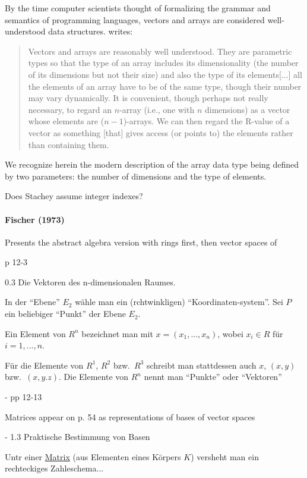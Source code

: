 By the time computer scientists thought of formalizing the grammar and semantics of programming languages,
vectors and arrays are considered well-understood data structures. \cite[\S 3.7.7, pp. 43--44]{Strachey1967} writes:
\begin{quote}
Vectors and arrays are reasonably well understood. They are parametric types so that the type of an array includes its dimensionality (the number of
its dimensions but not their size) and also the type of its elements[...]
all the elements of an array have to be of the same type, though their number may vary dynamically.
It is convenient, though perhaps not really necessary, to regard an $n$-array
(i.e., one with $n$ dimensions) as a vector whose elements are ($n-1$)-arrays.
We can then regard the R-value of a vector as something [that] gives access (or points to) the elements rather than containing them.
\end{quote}
We recognize herein the modern description of the array data type being defined by
two parameters: the number of dimensions and the type of elements.

Does Stachey assume integer indexes?



\paragraph{Fischer (1973)~\cite{Fischer1973}}

Presents the abstract algebra version with rings first, then vector spaces of

p 12-3

0.3 Die Vektoren des n-dimensionalen Raumes.

In der ``Ebene'' $E_2$ wähle man ein (rchtwinkligen) ``Koordinaten-system''. Sei $P$ ein beliebiger ``Punkt'' der Ebene $E_2$.

Ein Element von $R^n$ bezeichnet man mit $x = (x_1, ..., x_n)$, wobei $x_i \in R$ für $i = 1,..., n$.

Für die Elemente von $R^1$, $R^2$ bzw.\ $R^3$ schreibt man stattdessen auch $x$, $(x,y)$ bzw.\ $(x,y.z)$.
Die Elemente von $R^n$ nennt man ``Punkte'' oder ``Vektoren''

- pp 12-13

Matrices appear on p. 54 as representations of bases of vector spaces

- 1.3 Praktische Bestimmung von Basen

Untr einer \underline{Matrix} (aus Elementen eines Körpers $K$)  versheht man ein rechteckiges Zahleschema...

